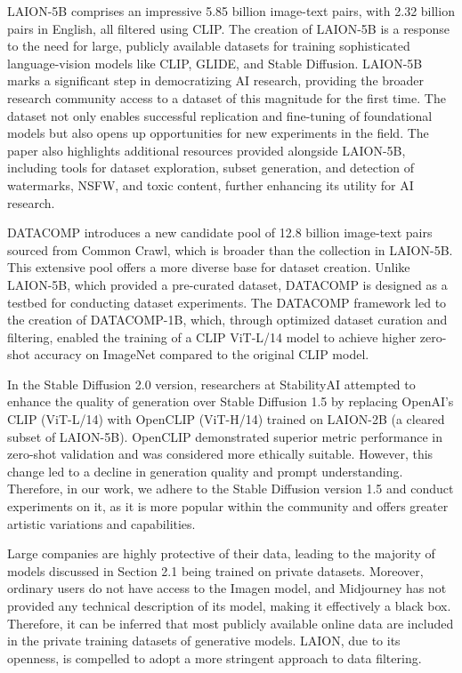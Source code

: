\documentclass[12pt, letterpaper]{article}
\begin{document}
LAION-5B comprises an impressive 5.85 billion image-text pairs, with 2.32 billion pairs in English, all filtered using CLIP. The creation of LAION-5B is a response to the need for large, publicly available datasets for training sophisticated language-vision models like CLIP, GLIDE, and Stable Diffusion. LAION-5B marks a significant step in democratizing AI research, providing the broader research community access to a dataset of this magnitude for the first time. The dataset not only enables successful replication and fine-tuning of foundational models but also opens up opportunities for new experiments in the field. The paper also highlights additional resources provided alongside LAION-5B, including tools for dataset exploration, subset generation, and detection of watermarks, NSFW, and toxic content, further enhancing its utility for AI research.

DATACOMP introduces a new candidate pool of 12.8 billion image-text pairs sourced from Common Crawl, which is broader than the collection in LAION-5B. This extensive pool offers a more diverse base for dataset creation. Unlike LAION-5B, which provided a pre-curated dataset, DATACOMP is designed as a testbed for conducting dataset experiments. The DATACOMP framework led to the creation of DATACOMP-1B, which, through optimized dataset curation and filtering, enabled the training of a CLIP ViT-L/14 model to achieve higher zero-shot accuracy on ImageNet compared to the original CLIP model.

In the Stable Diffusion 2.0 version, researchers at StabilityAI attempted to enhance the quality of generation over Stable Diffusion 1.5 by replacing OpenAI's CLIP (ViT-L/14) with OpenCLIP (ViT-H/14) trained on LAION-2B (a cleared subset of LAION-5B). OpenCLIP demonstrated superior metric performance in zero-shot validation and was considered more ethically suitable. However, this change led to a decline in generation quality and prompt understanding. Therefore, in our work, we adhere to the Stable Diffusion version 1.5 and conduct experiments on it, as it is more popular within the community and offers greater artistic variations and capabilities.

Large companies are highly protective of their data, leading to the majority of models discussed in Section 2.1 being trained on private datasets. Moreover, ordinary users do not have access to the Imagen model, and Midjourney has not provided any technical description of its model, making it effectively a black box. Therefore, it can be inferred that most publicly available online data are included in the private training datasets of generative models. LAION, due to its openness, is compelled to adopt a more stringent approach to data filtering.
\end{document}

